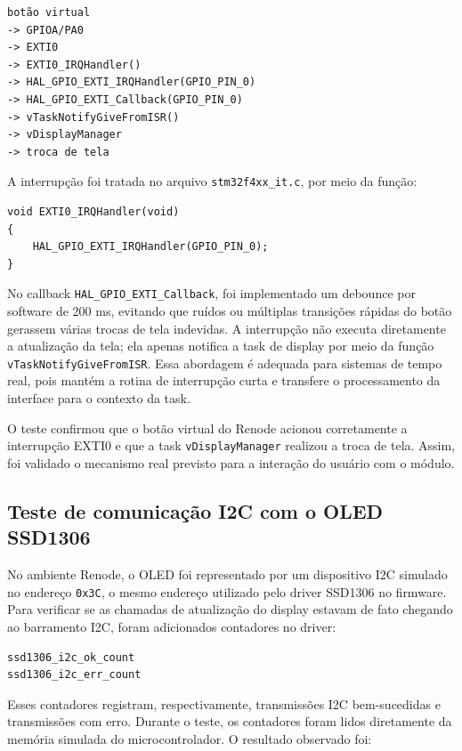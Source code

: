 \documentclass[a4paper,10pt]{article}
\begin{document}
\begin{verbatim}
botão virtual
-> GPIOA/PA0
-> EXTI0
-> EXTI0_IRQHandler()
-> HAL_GPIO_EXTI_IRQHandler(GPIO_PIN_0)
-> HAL_GPIO_EXTI_Callback(GPIO_PIN_0)
-> vTaskNotifyGiveFromISR()
-> vDisplayManager
-> troca de tela
\end{verbatim}

A interrupção foi tratada no arquivo \texttt{stm32f4xx\_it.c}, por meio da função:

\begin{verbatim}
void EXTI0_IRQHandler(void)
{
    HAL_GPIO_EXTI_IRQHandler(GPIO_PIN_0);
}
\end{verbatim}

No callback \texttt{HAL\_GPIO\_EXTI\_Callback}, foi implementado um debounce por software de 200 ms, evitando que ruídos ou múltiplas transições rápidas do botão gerassem várias trocas de tela indevidas. A interrupção não executa diretamente a atualização da tela; ela apenas notifica a task de display por meio da função \texttt{vTaskNotifyGiveFromISR}. Essa abordagem é adequada para sistemas de tempo real, pois mantém a rotina de interrupção curta e transfere o processamento da interface para o contexto da task.

O teste confirmou que o botão virtual do Renode acionou corretamente a interrupção EXTI0 e que a task \texttt{vDisplayManager} realizou a troca de tela. Assim, foi validado o mecanismo real previsto para a interação do usuário com o módulo.

\subsection{Teste de comunicação I2C com o OLED SSD1306}

No ambiente Renode, o OLED foi representado por um dispositivo I2C simulado no endereço \texttt{0x3C}, o mesmo endereço utilizado pelo driver SSD1306 no firmware. Para verificar se as chamadas de atualização do display estavam de fato chegando ao barramento I2C, foram adicionados contadores no driver:

\begin{verbatim}
ssd1306_i2c_ok_count
ssd1306_i2c_err_count
\end{verbatim}

Esses contadores registram, respectivamente, transmissões I2C bem-sucedidas e transmissões com erro. Durante o teste, os contadores foram lidos diretamente da memória simulada do microcontrolador. O resultado observado foi:
\end{document}

